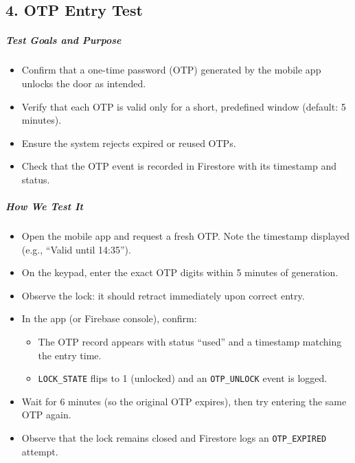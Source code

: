 \newpage
\begin{samepage}
    \subsection*{4. OTP Entry Test}

    \subparagraph{Test Goals and Purpose}
    \begin{itemize}
        \item Confirm that a one-time password (OTP) generated by the mobile app unlocks the door as intended.
        \item Verify that each OTP is valid only for a short, predefined window (default: 5 minutes).
        \item Ensure the system rejects expired or reused OTPs.
        \item Check that the OTP event is recorded in Firestore with its timestamp and status.
    \end{itemize}

    \subparagraph{How We Test It}
    \begin{itemize}
        \item Open the mobile app and request a fresh OTP. Note the timestamp displayed (e.g., “Valid until 14:35”).
        \item On the keypad, enter the exact OTP digits within 5 minutes of generation.
        \item Observe the lock: it should retract immediately upon correct entry.
        \item In the app (or Firebase console), confirm:
        \begin{itemize}
            \item The OTP record appears with status “used” and a timestamp matching the entry time.
            \item \texttt{LOCK\_STATE} flips to 1 (unlocked) and an \texttt{OTP\_UNLOCK} event is logged.
        \end{itemize}
        \item Wait for 6 minutes (so the original OTP expires), then try entering the same OTP again.
        \item Observe that the lock remains closed and Firestore logs an \texttt{OTP\_EXPIRED} attempt.
    \end{itemize}


\end{samepage}

